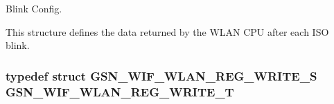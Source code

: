 Blink Config. 

This structure defines the data returned by the WLAN CPU after each ISO blink. \hypertarget{a00611_a7ce83264f6ee8297b7b8757ae3820c18}{
\subsubsection[{GSN\_\-WIF\_\-WLAN\_\-REG\_\-WRITE\_\-T}]{\setlength{\rightskip}{0pt plus 5cm}typedef struct {\bf GSN\_\-WIF\_\-WLAN\_\-REG\_\-WRITE\_\-S} {\bf GSN\_\-WIF\_\-WLAN\_\-REG\_\-WRITE\_\-T}}}
\label{a00611_a7ce83264f6ee8297b7b8757ae3820c18}
